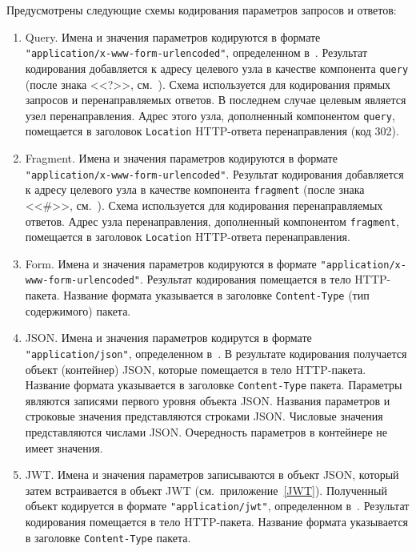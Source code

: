 Предусмотрены следующие схемы кодирования параметров запросов и ответов:
\begin{enumerate}
\item
Query. 
Имена и значения параметров кодируются в формате 
\lstinline{"application/x-www-form-urlencoded"}, определенном в~\cite{HTML4}. 
%
Результат кодирования добавляется к адресу целевого узла в качестве 
компонента \lstinline{query} (после знака <<?>>, см.~\cite{RFC3986}).
%
Схема используется для кодирования прямых запросов и перенаправляемых ответов.
%
В последнем случае целевым является узел перенаправления.
%
Адрес этого узла, дополненный компонентом \lstinline{query}, 
помещается в заголовок \lstinline{Location} HTTP-ответа перенаправления 
(код 302). 

\item
Fragment.
Имена и значения параметров кодируются в формате 
\lstinline{"application/x-www-form-urlencoded"}.
%
Результат кодирования добавляется к адресу целевого узла в качестве 
компонента \lstinline{fragment} (после знака <<\#>>, см.~\cite{RFC3986}).
%
Схема используется для кодирования перенаправляемых ответов.
%
Адрес узла перенаправления, дополненный компонентом \lstinline{fragment}, 
помещается в заголовок \lstinline{Location} HTTP-ответа перенаправления. 

\item
Form.
Имена и значения параметров кодируются в формате 
\lstinline{"application/x-www-form-urlencoded"}. 
%
Результат кодирования помещается в тело HTTP-пакета. 
%
Название формата указывается в заголовке \lstinline{Content-Type} 
(тип содержимого) пакета.  

\item
JSON.
Имена и значения параметров кодирутся в формате \lstinline{"application/json"}, 
определенном в~\cite{RFC4627}. В результате кодирования получается объект 
(контейнер) JSON, которые помещается в тело HTTP-пакета. 
Название формата указывается в заголовке \lstinline{Content-Type} пакета. 
%
Параметры являются записями первого уровня объекта JSON.
Названия параметров и строковые значения представляются строками JSON.
Числовые значения представляются числами JSON.
Очередность параметров в контейнере не имеет значения.

\item
JWT.
Имена и значения параметров записываются в объект JSON, который затем 
встраивается в объект JWT (см.~приложение~\ref{JWT}).
%
Полученный объект кодируется в формате \lstinline{"application/jwt"}, 
определенном в~\cite{RFC7519}.
%
Результат кодирования помещается в тело HTTP-пакета. Название формата 
указывается в заголовке \lstinline{Content-Type} пакета. 


\end{enumerate}

